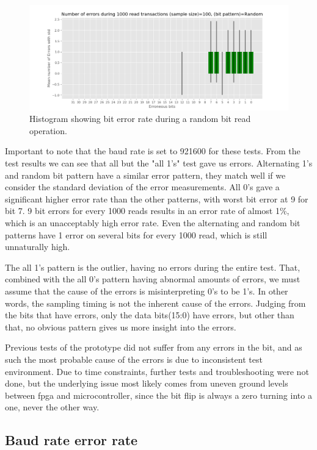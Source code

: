 \documentclass[main.tex]{subfiles}
\begin{document}
\begin{figure}[!ht]
    \centering
    \includegraphics[width=18cm]{images/error_rate_random.png}
    \caption{Histogram showing bit error rate during a random bit read operation.}
    \label{fig: rand_bit_rate}
\end{figure}
\FloatBarrier

Important to note that the baud rate is set to 921600 for these tests. From the test results we can see that all but the "all 1's" test gave us errors. Alternating 1's and random bit pattern have a similar error pattern, they match well if we consider the standard deviation of the error measurements. All 0's gave a significant higher error rate than the other patterns, with worst bit error at 9 for bit 7. 9 bit errors for every 1000 reads results in an error rate of almost 1\%, which is an unacceptably high error rate. Even the alternating and random bit patterns have 1 error on several bits for every 1000 read, which is still unnaturally high.

The all 1's pattern is the outlier, having no errors during the entire test. That, combined with the all 0's pattern having abnormal amounts of errors, we must assume that the cause of the errors is misinterpreting 0's to be 1's. In other words, the sampling timing is not the inherent cause of the errors. Judging from the bits that have errors, only the data bits(15:0) have errors, but other than that, no obvious pattern gives us more insight into the errors.

Previous tests of the prototype did not suffer from any errors in the bit, and as such the most probable cause of the errors is due to inconsistent test environment. Due to time constraints, further tests and troubleshooting were not done, but the underlying issue most likely comes from uneven ground levels between \gls{fpga} and microcontroller, since the bit flip is always a zero turning into a one, never the other way.

\subsection{Baud rate error rate}
\end{document}

